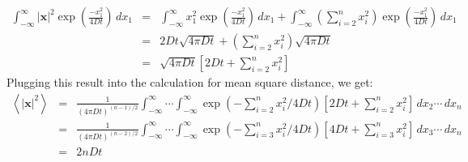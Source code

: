 \documentclass{article}
\begin{document}
\begin{eqnarray*}
\int_{-\infty}^{\infty} |\mathbf{x}|^2 \exp \left( \frac{-x_1^2}{4Dt} \right) \,dx_1 & = & \int_{-\infty}^{\infty} x_1^2 \exp \left( \frac{-x_1^2}{4Dt} \right) \,dx_1 + \int_{-\infty}^{\infty} \left(\sum_{i=2}^{n} x_i^2\right) \exp \left( \frac{-x_1^2}{4Dt} \right) \,dx_1 \\
& = & 2Dt\sqrt{4\pi Dt} + \left(\sum_{i=2}^{n} x_i^2\right) \sqrt{4\pi Dt} \\
& = & \sqrt{4\pi Dt} \left[ 2Dt + \sum_{i=2}^{n} x_i^2 \right]
\end{eqnarray*}
Plugging this result into the calculation for mean square distance, we get:
\begin{eqnarray*}
\left< |\mathbf{x}|^2 \right>  & = & \frac{1}{\left(4\pi Dt\right)^{(n-1)/2}} \int_{-\infty}^{\infty} \cdots \int_{-\infty}^{\infty} \exp\left(- \sum_{i=2}^{n} x_i^2/4Dt\right) \left[ 2Dt + \sum_{i=2}^{n} x_i^2 \right] \,dx_2 \cdots \,dx_n \\
& = & \frac{1}{\left(4\pi Dt\right)^{(n-2)/2}} \int_{-\infty}^{\infty} \cdots \int_{-\infty}^{\infty} \exp\left(- \sum_{i=3}^{n} x_i^2/4Dt\right) \left[ 4Dt + \sum_{i=3}^{n} x_i^2 \right] \,dx_3 \cdots \,dx_n \\
& = & 2nDt
\end{eqnarray*}
\end{document}
